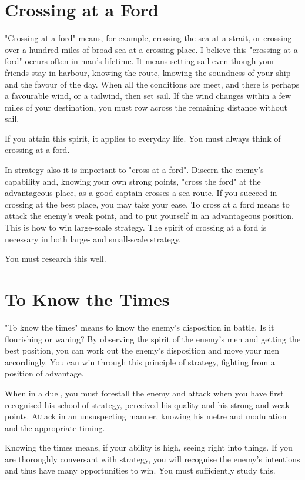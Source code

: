 \documentclass[12pt]{report}
\begin{document}
\section*{Crossing at a Ford}

"Crossing at a ford" means, for example, crossing the sea at a strait, or crossing over a hundred miles of broad sea at a crossing place. I believe this "crossing at a ford" occurs often in man's lifetime. It means setting sail even though your friends stay in harbour, knowing the route, knowing the soundness of your ship and the favour of the day. When all the conditions are meet, and there is perhaps a favourable wind, or a tailwind, then set sail. If the wind changes within a few miles of your destination, you must row across the remaining distance without sail.

If you attain this spirit, it applies to everyday life. You must always think of crossing at a ford.

In strategy also it is important to "cross at a ford". Discern the enemy's capability and, knowing your own strong points, "cross the ford" at the advantageous place, as a good captain crosses a sea route. If you succeed in crossing at the best place, you may take your ease. To cross at a ford means to attack the enemy's weak point, and to put yourself in an advantageous position. This is how to win large-scale strategy. The spirit of crossing at a ford is necessary in both large- and small-scale strategy.

You must research this well.
\section*{To Know the Times}

"To know the times" means to know the enemy's disposition in battle. Is it flourishing or waning? By observing the spirit of the enemy's men and getting the best position, you can work out the enemy's disposition and move your men accordingly. You can win through this principle of strategy, fighting from a position of advantage.

When in a duel, you must forestall the enemy and attack when you have first recognised his school of strategy, perceived his quality and his strong and weak points. Attack in an unsuspecting manner, knowing his metre and modulation and the appropriate timing.

Knowing the times means, if your ability is high, seeing right into things. If you are thoroughly conversant with strategy, you will recognise the enemy's intentions and thus have many opportunities to win. You must sufficiently study this.
\end{document}
